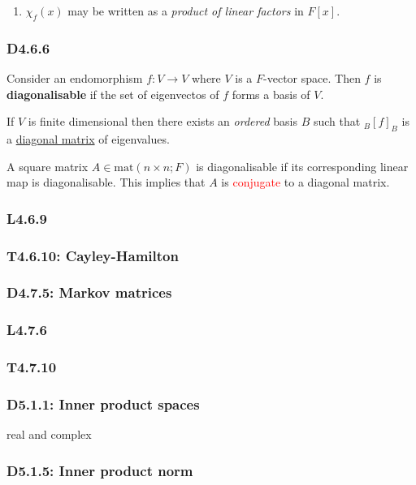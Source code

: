 \documentclass{article}
\begin{document}
\begin{multicols*}{3}
\begin{enumerate}
    \item $\chi_f(x)$ may be written as a
    \textit{product of linear factors} in $F[x]$.
\end{enumerate}

\subsubsection*{D4.6.6}
Consider an endomorphism $f:V\rightarrow V$ where $V$ is a
$F$-vector space. Then $f$ is \textbf{diagonalisable} if the set of
eigenvectos of $f$ forms a basis of $V$.

If $V$ is finite dimensional then there exists an \textit{ordered}
basis $B$ such that ${}_B[f]_B$ is a
\underline{diagonal matrix} of eigenvalues.

A square matrix $A\in\text{mat}(n\times n;F)$ is diagonalisable if
its corresponding linear map is diagonalisable. This implies that
$A$ is \textcolor{red}{conjugate} to a diagonal matrix.

\subsubsection*{L4.6.9}

\subsubsection*{T4.6.10: Cayley-Hamilton}

\subsubsection*{D4.7.5: Markov matrices}

\subsubsection*{L4.7.6}

\subsubsection*{T4.7.10}

\newcolumn

\subsubsection*{D5.1.1: Inner product spaces}
real and complex

\subsubsection*{D5.1.5: Inner product norm}


\end{multicols*}
\end{document}
